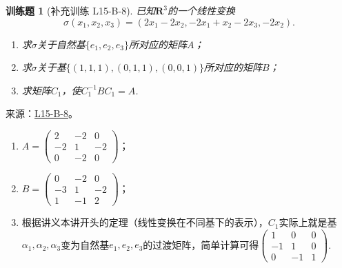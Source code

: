 \documentclass[UTF8,12pt,a4paper,fontset=fandol]{ctexart}
\newtheorem{exercise}{训练题}[section]
\begin{document}
\begin{exercise}[补充训练 L15-B-8]\label{prob:L15-B-8}
已知$\mathbf{R}^3$的一个线性变换
        \[\sigma(x_1,x_2,x_3)=(2x_1-2x_2,-2x_1+x_2-2x_3,-2x_2).\]
        \begin{enumerate}
            \item 求$\sigma$关于自然基$\{e_1,e_2,e_3\}$所对应的矩阵$A$；

            \item 求$\sigma$关于基$\{(1,1,1),(0,1,1),(0,0,1)\}$所对应的矩阵$B$；

            \item 求矩阵$C_1$，使$C_1^{-1}BC_1=A$.
        \end{enumerate}
\end{exercise}
\noindent 来源：\href{https://github.com/yhwu-is/Linear-Algebra-Left-Undone/blob/new/%E8%AE%B2%E4%B9%89/%E4%B8%93%E9%A2%98/15%20%E7%9B%B8%E4%BC%BC%E6%A0%87%E5%87%86%E5%BD%A2%EF%BC%9A%E5%A4%8D%E6%95%B0%E5%9F%9F%E4%B8%8A%E7%9A%84%E5%B0%9D%E8%AF%95%E4%B8%8E%E7%90%86%E8%AE%BA.tex}{L15-B-8}。
\begin{solve}
\begin{enumerate}
                \item $A=\begin{pmatrix}
                              2 & -2 & 0 \\ -2 & 1 & -2 \\ 0 & -2 & 0
                          \end{pmatrix}$；

                \item $B=\begin{pmatrix}
                              0 & -2 & 0 \\ -3 & 1 & -2 \\ 1 & -1 & 2
                          \end{pmatrix}$；

                \item 根据讲义本讲开头的定理（线性变换在不同基下的表示），$C_1$实际上就是基$\alpha_1,\alpha_2,\alpha_3$变为自然基$e_1,e_2,e_3$的过渡矩阵，简单计算可得$\begin{pmatrix}
                              1 & 0 & 0 \\ -1 & 1 & 0 \\ 0 & -1 & 1
                          \end{pmatrix}$.
            \end{enumerate}
\end{solve}
\end{document}
